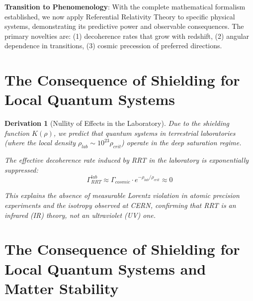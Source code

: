\documentclass[10pt, a4paper]{article}
\newtheorem{derivation}{Derivation}
\begin{document}
\textbf{Transition to Phenomenology}: With the complete mathematical formalism established, we now apply Referential Relativity Theory to specific physical systems, demonstrating its predictive power and observable consequences. The primary novelties are: (1) decoherence rates that grow with redshift, (2) angular dependence in transitions, (3) cosmic precession of preferred directions.

\section{The Consequence of Shielding for Local Quantum Systems}

\begin{derivation}[Nullity of Effects in the Laboratory]
Due to the shielding function $K(\rho)$, we predict that quantum systems in terrestrial laboratories (where the local density $\rho_{lab} \sim 10^{23} \rho_{crit}$) operate in the deep saturation regime.

The effective decoherence rate induced by RRT in the laboratory is exponentially suppressed:
\begin{equation}
\Gamma_{RRT}^{lab} \approx \Gamma_{cosmic} \cdot e^{-\rho_{lab}/\rho_{crit}} \approx 0
\end{equation}

This explains the absence of measurable Lorentz violation in atomic precision experiments and the isotropy observed at CERN, confirming that RRT is an infrared (IR) theory, not an ultraviolet (UV) one.
\end{derivation}


\section{The Consequence of Shielding for Local Quantum Systems and Matter Stability}
\end{document}
